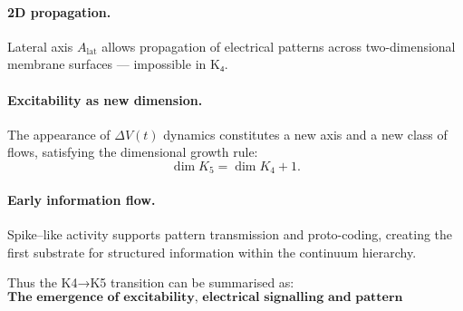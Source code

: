 \paragraph{2D propagation.}
Lateral axis $A_{\mathrm{lat}}$ allows propagation of electrical patterns
across two-dimensional membrane surfaces — impossible in K₄.

\paragraph{Excitability as new dimension.}
The appearance of $\Delta V(t)$ dynamics constitutes a new axis and a new
class of flows, satisfying the dimensional growth rule:
\[
\dim K_5 = \dim K_4 + 1.
\]

\paragraph{Early information flow.}
Spike–like activity supports pattern transmission and proto-coding,
creating the first substrate for structured information within the
continuum hierarchy.

Thus the K4→K5 transition can be summarised as:
\[
\textbf{The emergence of excitability, electrical signalling and
pattern propagation from biological gradients and membranes.}
\]

